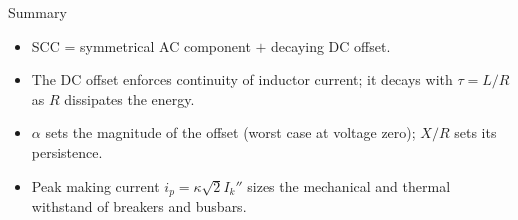 \begin{frame}{Summary}
  \begin{itemize}
    \setlength{\itemsep}{0.6em}
    \item SCC = symmetrical AC component $+$ decaying DC offset.
    \item The DC offset enforces continuity of inductor current; it decays with
          $\tau=L/R$ as $R$ dissipates the energy.
    \item $\alpha$ sets the magnitude of the offset (worst case at voltage zero);
          $X/R$ sets its persistence.
    \item Peak making current $i_p=\kappa\sqrt{2}I_k''$ sizes the mechanical and
          thermal withstand of breakers and busbars.
  \end{itemize}
\end{frame}

